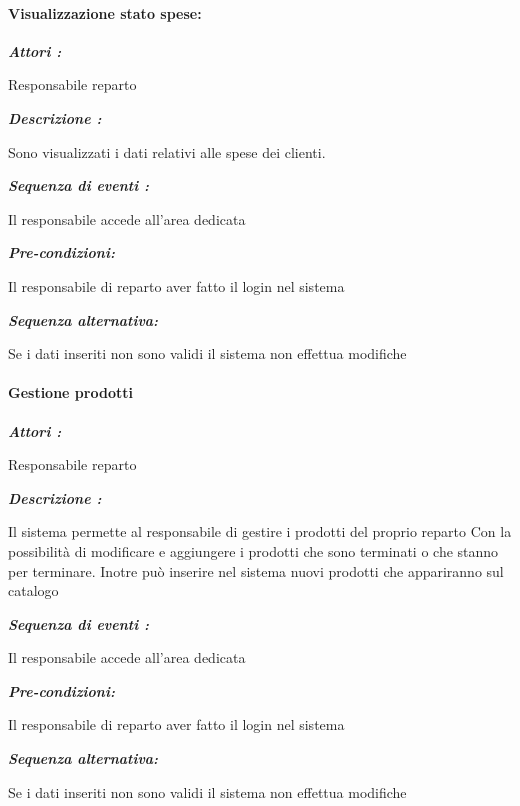 \documentclass{article}
\begin{document}
\paragraph{Visualizzazione stato spese:}
\begin{mdframed}

	\noindent\textit{\textbf{Attori :}}


	Responsabile reparto

	\noindent\textit{\textbf{Descrizione :}}


	Sono visualizzati i dati relativi alle spese dei clienti.

	\noindent\textit{\textbf{Sequenza di eventi :}}


	Il responsabile accede all'area dedicata

	\noindent\textit{\textbf{Pre-condizioni:}}


	Il responsabile di reparto aver fatto il login nel sistema
	

    \noindent\textit{\textbf{Sequenza alternativa:}}
	

    Se i dati inseriti non sono validi il sistema non effettua modifiche

\end{mdframed}

\paragraph{Gestione prodotti}

\begin{mdframed}

	\noindent\textit{\textbf{Attori :}}


	Responsabile reparto

	\noindent\textit{\textbf{Descrizione :}}


	Il sistema permette al responsabile di gestire i prodotti del proprio reparto
	Con la possibilità di modificare e aggiungere i prodotti che sono terminati o che stanno
	per terminare.
	Inotre può inserire nel sistema nuovi prodotti che appariranno sul catalogo

	\noindent\textit{\textbf{Sequenza di eventi :}}


	Il responsabile accede all'area dedicata

	\noindent\textit{\textbf{Pre-condizioni:}}


	Il responsabile di reparto aver fatto il login nel sistema

    \noindent\textit{\textbf{Sequenza alternativa:}}
	

    Se i dati inseriti non sono validi il sistema non effettua modifiche
\end{mdframed}
\end{document}
